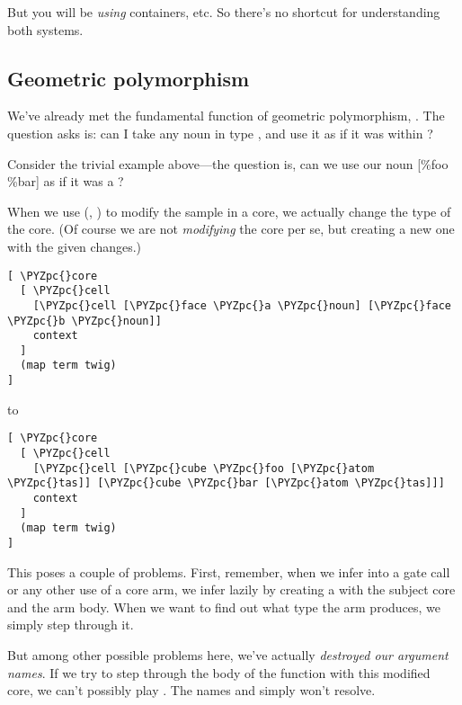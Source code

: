 But you will be \emph{using} containers, etc.  So there's no shortcut
for understanding both systems.

\subsection{Geometric polymorphism}

We've already met the fundamental function of geometric
polymorphism, .  The question  asks is:
can I take any noun in type , and use it as if it was within
?

Consider the trivial example above---the question is, can we use
our noun [\%foo \%bar] as if it was a \kode{[a=\textbackslash{}* b=\textbackslash{}*]}?  

When we use \kode{\%=} (, ) to modify the sample in a
core, we actually change the type of the core.  (Of course we are
not \emph{modifying} the core per se, but creating a new one with the
given changes.)

\begin{framed_shaded}
\begin{Verbatim}[fontsize=\relsize{-2.5},fontseries=b,commandchars=\\\{\}]
[ \PYZpc{}core
  [ \PYZpc{}cell 
    [\PYZpc{}cell [\PYZpc{}face \PYZpc{}a \PYZpc{}noun] [\PYZpc{}face \PYZpc{}b \PYZpc{}noun]]
    context
  ]
  (map term twig)
]
\end{Verbatim}
\end{framed_shaded}
to

\begin{framed_shaded}
\begin{Verbatim}[fontsize=\relsize{-2.5},fontseries=b,commandchars=\\\{\}]
[ \PYZpc{}core
  [ \PYZpc{}cell 
    [\PYZpc{}cell [\PYZpc{}cube \PYZpc{}foo [\PYZpc{}atom \PYZpc{}tas]] [\PYZpc{}cube \PYZpc{}bar [\PYZpc{}atom \PYZpc{}tas]]]
    context
  ]
  (map term twig)
]
\end{Verbatim}
\end{framed_shaded}
This poses a couple of problems.  First, remember, when we infer
into a gate call or any other use of a core arm, we infer lazily
by creating a  with the subject core and the
arm body.  When we want to find out what type the arm produces,
we simply step through it.

But among other possible problems here, we've actually \emph{destroyed
our argument names}.  If we try to step through the body of the
function with this modified core, we can't possibly play \kode{[b a]}.
The names  and  simply won't resolve.

